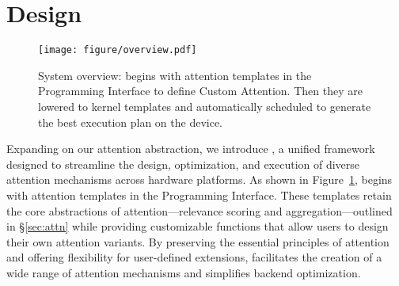 \section{Design}
\label{sec:design}




\begin{figure}[t]
    \centering
    \texttt{[image: figure/overview.pdf]}
    \caption{System overview: \oursys{} begins with attention templates in the Programming Interface to define Custom Attention. Then they are lowered to kernel templates and automatically scheduled to generate the best execution plan on the device.}
  \vspace{-5mm}
    \label{fig:overview}
\end{figure}

Expanding on our attention abstraction, we introduce \oursys{}, a unified framework designed to streamline the design, optimization, and execution of diverse attention mechanisms across hardware platforms. As shown in Figure~\ref{fig:overview}, \oursys{} begins with attention templates in the Programming Interface. These templates retain the core abstractions of attention—relevance scoring and aggregation—outlined in \S\ref{sec:attn} while providing customizable functions that allow users to design their own attention variants. By preserving the essential principles of attention and offering flexibility for user-defined extensions, \oursys{} facilitates the creation of a wide range of attention mechanisms and simplifies backend optimization.

